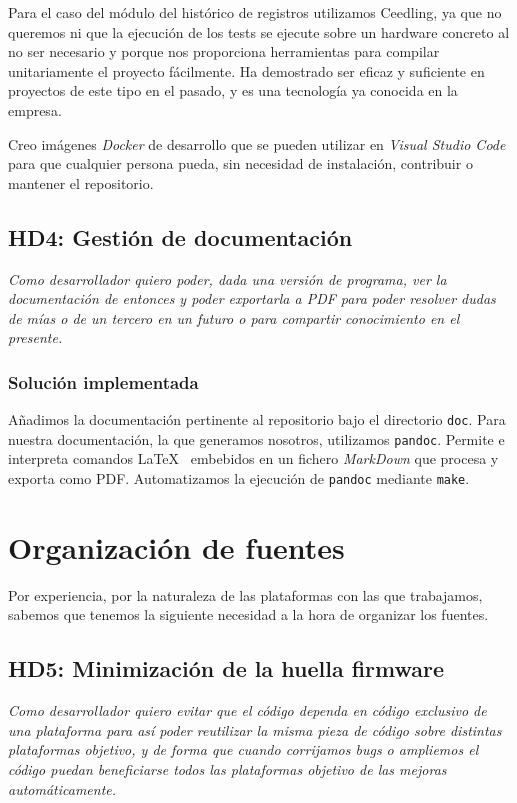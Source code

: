 Para el caso del módulo del histórico de registros utilizamos
Ceedling, ya que no queremos ni que la ejecución de los tests
se ejecute sobre un hardware concreto al no ser necesario y
porque nos proporciona herramientas para compilar unitariamente
el proyecto fácilmente. Ha demostrado ser eficaz y suficiente
en proyectos de este tipo en el pasado, y es una tecnología ya
conocida en la empresa.

Creo imágenes \textit{Docker} de desarrollo que se pueden utilizar en
\textit{Visual Studio Code} para que cualquier persona pueda, sin
necesidad de instalación, contribuir o mantener el repositorio.

\subsection{HD4: Gestión de documentación}

\textit{Como desarrollador quiero poder, dada una versión de programa,
ver la documentación de entonces y poder exportarla a PDF para
poder resolver dudas de mías o de un tercero en un futuro o
para compartir conocimiento en el presente.}

\subsubsection{Solución implementada}

Añadimos la documentación pertinente al repositorio bajo el directorio
\texttt{doc}. Para nuestra documentación, la que generamos nosotros,
utilizamos \texttt{pandoc}. Permite e interpreta comandos \LaTeX
\ embebidos en un fichero \textit{MarkDown} que procesa y exporta como PDF.
Automatizamos la ejecución de \texttt{pandoc} mediante \texttt{make}.

\section{Organización de fuentes}

Por experiencia, por la naturaleza de las plataformas con las que
trabajamos, sabemos que tenemos la siguiente necesidad a la hora
de organizar los fuentes.

\subsection{HD5: Minimización de la huella firmware}

\textit{Como desarrollador quiero evitar que el código dependa en
código exclusivo de una plataforma para así poder reutilizar
la misma pieza de código sobre distintas plataformas objetivo, y de forma
que cuando corrijamos bugs o ampliemos el código puedan beneficiarse
todos las plataformas objetivo de las mejoras automáticamente.}


